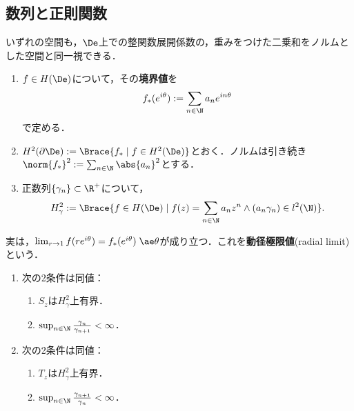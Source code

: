 \documentclass[uplatex,dvipdfmx]{jsreport}
\begin{document}
\subsection{数列と正則関数}

\begin{tcolorbox}[colframe=ForestGreen, colback=ForestGreen!10!white,breakable,colbacktitle=ForestGreen!40!white,coltitle=black,fonttitle=\bfseries\sffamily,
title=]
    いずれの空間も，$\De$上での整関数展開係数の，重みをつけた二乗和をノルムとした空間と同一視できる．
\end{tcolorbox}

\begin{notation}\mbox{}
    \begin{enumerate}
        \item $f\in H(\De)$について，その\textbf{境界値}を
        \[f_*(e^{i\theta}):=\sum_{n\in\N}a_ne^{in\theta}\]
        で定める．
        \item $H^2(\partial\De):=\Brace{f_*\mid f\in H^2(\De)}$とおく．ノルムは引き続き$\norm{f_*}^2:=\sum_{n\in\N}\abs{a_n}^2$とする．
        \item 正数列$\{\gamma_n\}\subset\R^+$について，
        \[H^2_\gamma:=\Brace{f\in H(\De)\mid f(z)=\sum_{n\in\N}a_nz^n\land(a_n\gamma_n)\in l^2(\N)}.\]
    \end{enumerate}
\end{notation}
\begin{remarks}
    実は，$\lim_{r\to1}f(re^{i\theta})=f_*(e^{i\theta})\;\ae\theta$が成り立つ．これを\textbf{動径極限値}(radial limit)という．
\end{remarks}

\begin{theorem}\mbox{}
    \begin{enumerate}
        \item 次の2条件は同値：
        \begin{enumerate}
            \item $S_z$は$H^2_\gamma$上有界．
            \item $\sup_{n\in\N}\frac{\gamma_n}{\gamma_{n+1}}<\infty$．
        \end{enumerate}
        \item 次の2条件は同値：
        \begin{enumerate}
            \item $T_z$は$H^2_\gamma$上有界．
            \item $\sup_{n\in\N}\frac{\gamma_{n+1}}{\gamma_{n}}<\infty$．
        \end{enumerate}
    \end{enumerate}
\end{theorem}
\end{document}
